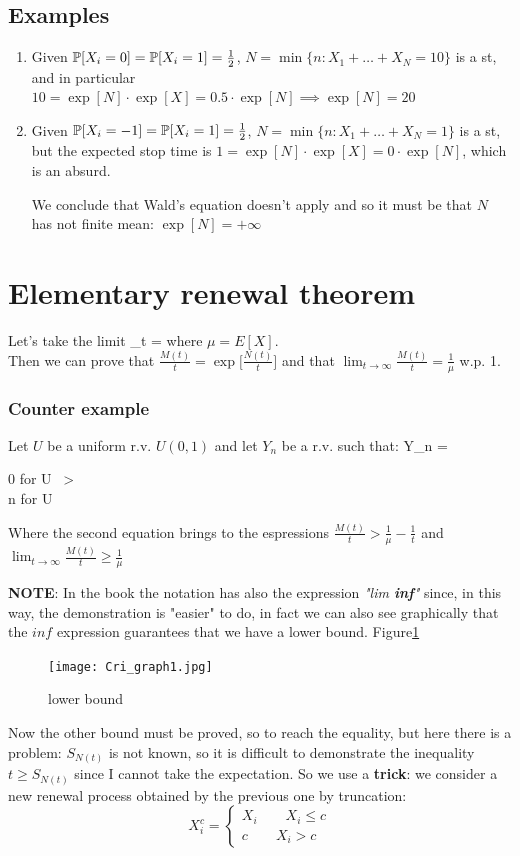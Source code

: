 \subsection{Examples}
	\begin{enumerate}
		\item Given $\mathbb{P}[X_i=0]=\mathbb{P}[X_i = 1] = \frac{1}{2}$, $N = \min\{n : X_1 + \dots + X_N =10\}$ is a \gls{st}, and in particular
		$10 = \exp[N] \cdot \exp[X] = 0.5 \cdot \exp[N] \implies \exp[N]=20$
		\item Given $\mathbb{P}[X_i=-1]=\mathbb{P}[X_i = 1] = \frac{1}{2}$, $N = \min\{n : X_1 + \dots + X_N =1\}$ is a \gls{st}, but the expected stop time
		is $1 = \exp[N] \cdot \exp[X] = 0 \cdot \exp[N] $, which is an absurd.

		We conclude that Wald's equation doesn't apply and so it must be that $N$ has not finite mean: $\exp[N]=+\infty$
	\end{enumerate}

	\section{Elementary renewal theorem}
	Let's take the limit
	\beq
	\lim_{t \to \infty} = 
	\eeq
	where $\mu = E[X]$.\\
	Then we can prove that $\frac{M(t)}{t} = \exp\bigg[\frac{N(t)}{t}\bigg]$ and that $\lim_{t \to \infty}\frac{M(t)}{t} = \frac{1}{\mu}$ w.p. 1.
	\subsubsection{Counter example}
	Let $U$ be a uniform r.v. $U(0,1)$ and let $Y_n$ be a r.v. such that:
	\beq
	Y_n =
	\begin{cases}
	0 \quad for \quad U \ > \\
	n \quad for \quad U \leq {}
	\end{cases}
	\eeq
	Where the second equation brings to the espressions $\frac{M(t)}{t} > \frac{1}{\mu} - \frac{1}{t}$ and $\lim_{t \to \infty} \frac{M(t)}{t} \geq \frac{1}{\mu}$

	\textbf{NOTE}: In the book the notation has also the expression \textit{"lim \textbf{inf}"} since, in this way, the demonstration is "easier" to do, in fact we can also see graphically that the $inf$ expression guarantees that we have a lower bound. Figure\ref{fig:graph1}
	\begin{figure}[h]
	\centering
	\texttt{[image: Cri\_graph1.jpg]}
	\caption{lower bound}
	\label{fig:graph1}
	\end{figure}
	Now the other bound must be proved, so to reach the equality, but here there is a problem: $S_{N(t)}$ is not known, so it is difficult to demonstrate the inequality $t \geq S_{N(t)}$ since I cannot take the expectation. So we use a \textbf{trick}: we consider a new renewal process obtained by the previous one by truncation:
	\begin{equation}
	X_i^c =
	\begin{cases}
	X_i \qquad X_i \leq c\\
	c \qquad X_i >c
	\end{cases}
	\end{equation}

